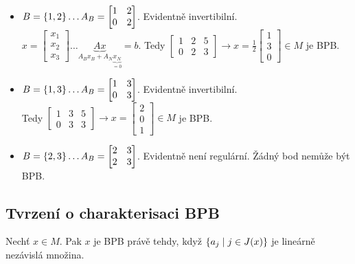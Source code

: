 \begin{itemize}
    \item $B = \left\lbrace 1,2 \right\rbrace \dots A_B =
    \begin{bmatrix}
        1 & 2 \\
        0 & 2
    \end{bmatrix}$. Evidentně invertibilní. \\
    $x =
    \begin{bmatrix}
    x_1 \\
    x_2 \\
    x_3
    \end{bmatrix} \dots \underbrace{Ax}_{A_B x_B +  A_N\underbrace{x_N}_{=0}}=b$. Tedy
    $\left[
        \begin{array}{cc|c}
        1 & 2 & 5 \\
        0 & 2 & 3
        \end{array}
    \right]
    \rightarrow x = \frac{1}{2}
    \begin{bmatrix}
        1 \\
        3 \\
        0
    \end{bmatrix} \in M$ je BPB.
    \item $B = \left\lbrace 1,3 \right\rbrace \dots A_B =
    \begin{bmatrix}
        1 & 3 \\
        0 & 3
    \end{bmatrix}$. Evidentně invertibilní. \\
    Tedy
    $\left[
        \begin{array}{cc|c}
        1 & 3 & 5 \\
        0 & 3 & 3
        \end{array}
    \right]
    \rightarrow x =
    \begin{bmatrix}
        2 \\
        0 \\
        1
    \end{bmatrix} \in M$ je BPB.
    \item $B = \left\lbrace 2,3 \right\rbrace \dots A_B =
    \begin{bmatrix}
        2 & 3 \\
        2 & 3
    \end{bmatrix}$. Evidentně není regulární. Žádný bod nemůže být BPB.
\end{itemize}

\subsection{Tvrzení o charakterisaci BPB}\label{charBPB}
Nechť $x \in M$. Pak $x$ je BPB právě tehdy, když $\left\lbrace a_j \mid j \in J(x) \right\rbrace$ je lineárně nezávislá množina.

